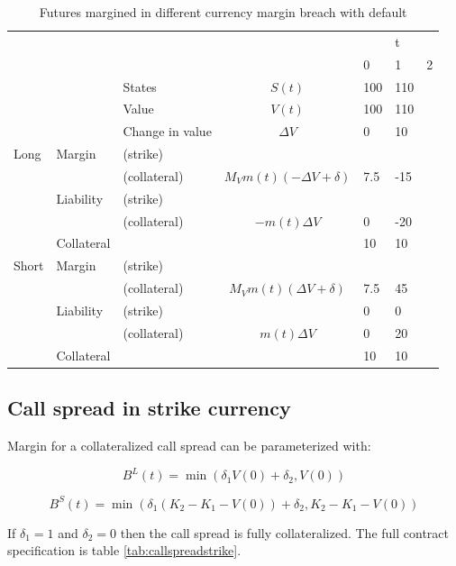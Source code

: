 \documentclass[12pt]{article}
\begin{document}
\begin{table}
\begin{tabular}{lll|c|lll}
&  &  &  &  & t &\\  
&  &  &  & 0 & 1 & 2 \\
\hline
\hline
&  & States &  $S(t)$ & 100 & 110 & \\
&  & Value  &  $V(t)$  & 100 & 110 &  \\
&  & Change in value & $\Delta V$ & 0& 10 &  \\
\hline
Long      & Margin    & (strike)     &  &  &  &  \\
          &           & (collateral) & $M_V m(t)(-\Delta V + \delta)$ & 7.5 & -15 &\\ 
          & Liability & (strike)     &  &  &  & \\ 
          &           & (collateral)&$-m(t) \Delta V$ & 0  & -20 &\\
          & Collateral&                       &    & 10 & 10 & \\
\hline
Short     & Margin    & (strike)     &   &  &  & \\
          &           & (collateral) & $M_V m(t)(\Delta V + \delta)$& 7.5 & 45 &\\
          & Liability & (strike)     &  & 0 & 0 & \\
          &           & (collateral) & $m(t)\Delta V$ & 0 & 20 &\\
          & Collateral&                       &    & 10 & 10 & \\ 
\hline          

\end{tabular}
\caption{Futures margined in different currency margin breach with default}
\label{fut}
\end{table}



\subsection{Call spread in strike currency}

Margin for a collateralized call spread can be parameterized with: 

\[ B^L(t) = \min(\delta_1 V(0) + \delta_2, V(0) ) \]

\[ B^S(t) = \min(\delta_1 (K_2-K_1-V(0)) + \delta_2, K_2-K_1-V(0) ) \]

If $\delta_1=1$ and $\delta_2=0$ then the call spread is fully collateralized. The full contract specification is table \ref{tab:callspreadstrike}.
\end{document}
